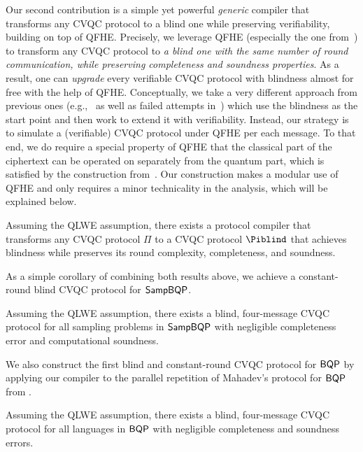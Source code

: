 Our second contribution is a simple yet powerful \emph{generic}  compiler that transforms any CVQC protocol to a blind one while preserving verifiability, building on top of QFHE. 
Precisely, we leverage QFHE (especially the one from~\cite{mahadev_qfhe}) to transform any CVQC protocol to \emph{a blind one with the same number of round communication, while preserving completeness and soundness properties}.
As a result, one can \emph{upgrade} every verifiable CVQC protocol with blindness almost for free with the help of QFHE.
Conceptually, we take a very different approach from previous ones  (e.g.,~\cite{FK17} as well as failed attempts in~\cite{mahadev_2018}) which use the blindness as the start point and then work to extend it with verifiability.
Instead, our strategy is to simulate a (verifiable) CVQC protocol under QFHE per each message.
To that end, we do require a special property of QFHE that the classical part of the ciphertext can be operated on separately from the quantum part, which is satisfied by the construction from~\cite{mahadev_qfhe}.
Our construction makes a modular use of QFHE and only requires a minor technicality in the analysis, which will be explained below. 
\begin{theorem}[informal]
Assuming the QLWE assumption, there exists a protocol compiler that transforms any CVQC protocol $\Pi$ to a CVQC protocol $\Piblind$ that achieves blindness while preserves its round complexity, completeness, and soundness.
\end{theorem}

As a simple corollary of combining both results above, we achieve a constant-round blind CVQC protocol for $\operatorname{\mathsf{SampBQP}}$. 
\begin{theorem}[informal]
        Assuming the QLWE assumption, there exists a blind, four-message CVQC protocol for all sampling problems in $\operatorname{\mathsf{SampBQP}}$ with negligible completeness error and computational soundness.
\end{theorem}

We also construct the first blind and constant-round CVQC protocol for $\operatorname{\mathsf{BQP}}$ by applying our compiler to the parallel repetition of Mahadev's protocol for $\operatorname{\mathsf{BQP}}$ from \cite{arXiv:ChiaChungYam19, arXiv:AlaChiHun19}.

\begin{theorem}[informal]
    Assuming the QLWE assumption, there exists a blind, four-message CVQC protocol for all languages in $\operatorname{\mathsf{BQP}}$ with negligible completeness and soundness errors.
\end{theorem}

